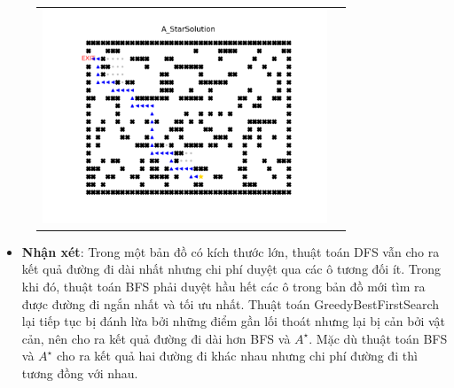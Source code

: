 \documentclass[11pt]{scrartcl} %
\begin{document}
\begin{itemize}
\begin{figure}[h]
\begin{tabular}{cc}
			\includegraphics[width=8.5cm]{Figures/fg5_astar.png}
		\end{tabular}
	\end{figure}
	\begin{itemize}
		\item \textbf{Nhận xét}: Trong một bản đồ có kích thước lớn, thuật toán DFS vẫn cho ra kết quả đường đi dài nhất nhưng chi phí duyệt qua các ô tương đối ít. Trong khi đó, thuật toán BFS phải duyệt hầu hết các ô trong bản đồ mới tìm ra được đường đi ngắn nhất và tối ưu nhất. Thuật toán GreedyBestFirstSearch lại tiếp tục bị đánh lừa bởi những điểm gần lối thoát nhưng lại bị cản bởi vật cản, nên cho ra kết quả đường đi dài hơn BFS và $A^{\star}$. Mặc dù thuật toán BFS và $A^{\star}$ cho ra kết quả hai đường đi khác nhau nhưng chi phí đường đi thì tương đồng với nhau.
	\end{itemize}
	\end{itemize}

\newpage
\end{document}
